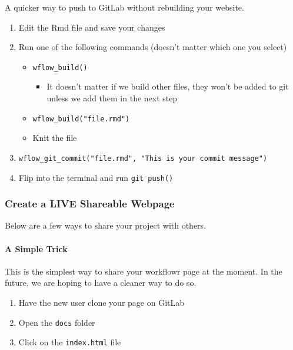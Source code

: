 \documentclass[openany]{article}
\providecommand{\tightlist}{%
  \setlength{\itemsep}{0pt}\setlength{\parskip}{0pt}}
\let\oldparagraph\paragraph
\renewcommand{\paragraph}[1]{\oldparagraph{#1}\mbox{}}
\begin{document}
A quicker way to push to GitLab without rebuilding your website.

\begin{enumerate}
\def\labelenumi{\arabic{enumi}.}
\tightlist
\item
  Edit the Rmd file and save your changes
\item
  Run one of the following commands (doesn't matter which one you select)

  \begin{itemize}
  \tightlist
  \item
    \texttt{wflow\_build()}

    \begin{itemize}
    \tightlist
    \item
      It doesn't matter if we build other files, they won't be added to git unless we add them in the next step
    \end{itemize}
  \item
    \texttt{wflow\_build("file.rmd")}
  \item
    Knit the file
  \end{itemize}
\item
  \texttt{wflow\_git\_commit("file.rmd",\ "This\ is\ your\ commit\ message")}
\item
  Flip into the terminal and run \texttt{git\ push()}
\end{enumerate}

\hypertarget{create-a-live-shareable-webpage}{%
\subsubsection{Create a LIVE Shareable Webpage}\label{create-a-live-shareable-webpage}}

Below are a few ways to share your project with others.

\hypertarget{a-simple-trick}{%
\paragraph{A Simple Trick}\label{a-simple-trick}}

This is the simplest way to share your workflowr page at the moment. In the future, we are hoping to have a cleaner way to do so.

\begin{enumerate}
\def\labelenumi{\arabic{enumi}.}
\tightlist
\item
  Have the new user clone your page on GitLab
\item
  Open the \texttt{docs} folder
\item
  Click on the \texttt{index.html} file
\end{enumerate}
\end{document}
